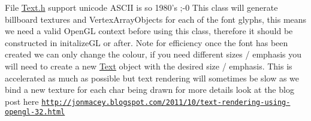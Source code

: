 \label{todo__todo000001}
\hypertarget{todo__todo000001}{}
 
\begin{DoxyDescription}
\item[File \hyperlink{Text_8h}{Text.h} ]support unicode ASCII is so 1980's ;-\/0 This class will generate billboard textures and VertexArrayObjects for each of the font glyphs, this means we need a valid OpenGL context before using this class, therefore it should be constructed in initalizeGL or after. Note for efficiency once the font has been created we can only change the colour, if you need different sizes / emphasis you will need to create a new \hyperlink{classText}{Text} object with the desired size / emphasis. This is accelerated as much as possible but text rendering will sometimes be slow as we bind a new texture for each char being drawn for more details look at the blog post here \href{http://jonmacey.blogspot.com/2011/10/text-rendering-using-opengl-32.html}{\tt http://jonmacey.blogspot.com/2011/10/text-\/rendering-\/using-\/opengl-\/32.html} 
\end{DoxyDescription}